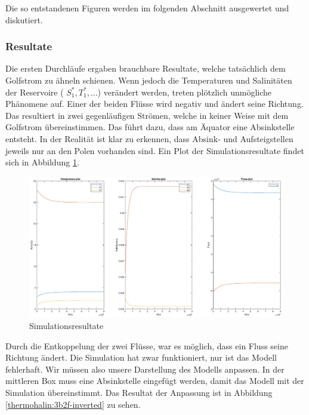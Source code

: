 Die so entstandenen Figuren werden im folgenden Abschnitt ausgewertet und diskutiert. 

\subsubsection{Resultate}


Die ersten Durchläufe ergaben brauchbare Resultate, welche tatsächlich dem Golfstrom zu ähneln schienen. Wenn jedoch die Temperaturen und Salinitäten der Reservoire ( $S_1^*, T_1^*,\dots$) verändert werden, treten plötzlich unmögliche Phänomene auf.
Einer der beiden Flüsse wird negativ und ändert seine Richtung. Das resultiert in zwei gegenläufigen Strömen, welche in keiner Weise mit dem Golfstrom übereinstimmen. Das führt dazu, dass am Äquator eine Absinkstelle entsteht. In der Realität ist klar zu erkennen, dass Absink- und Aufsteigstellen jeweils nur an den Polen vorhanden sind. 
Ein Plot der Simulationsresultate findet sich in Abbildung \ref{thermohalin:simulationsresultate}.

\begin{figure}
	\includegraphics[width=14cm]{thermohalin/Code/graphs/result-3b2f-script.eps}
	\centering
	\caption{Simulationsresultate}
	\label{thermohalin:simulationsresultate}
\end{figure}

Durch die Entkoppelung der zwei Flüsse, war es möglich, dass ein Fluss seine Richtung ändert.
Die Simulation hat zwar funktioniert, nur ist das Modell fehlerhaft. Wir müssen also unsere Darstellung des Modells anpassen. In der mittleren Box muss eine Absinkstelle eingefügt werden, damit das Modell mit der Simulation übereinstimmt. Das Resultat der Anpassung ist in Abbildung \ref{thermohalin:3b2f-inverted} zu sehen.

